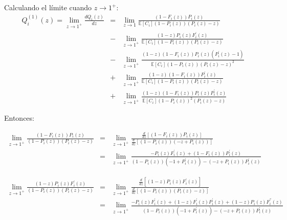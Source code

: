 \documentclass{article}
\newcommand{\esp}{\mathbb{E}}
\numberwithin{equation}{section}
\begin{document}
Calculando el l\'imite cuando $z\rightarrow1^{+}$:
\begin{eqnarray}
Q_{i}^{(1)}\left(z\right)=\lim_{z\rightarrow1^{+}}\frac{d Q_{i}\left(z\right)}{dz}&=&\lim_{z\rightarrow1}\frac{\left(1-F_{i}\left(z\right)\right)P_{i}\left(z\right)}{\esp\left[C_{i}\right]\left(1-P_{i}\left(z\right)\right)\left(P_{i}\left(z\right)-z\right)}\\
&-&\lim_{z\rightarrow1^{+}}\frac{\left(1-z\right)P_{i}\left(z\right)F_{i}^{'}\left(z\right)}{\esp\left[C_{i}\right]\left(1-P_{i}\left(z\right)\right)\left(P_{i}\left(z\right)-z\right)}\\
&-&\lim_{z\rightarrow1^{+}}\frac{\left(1-z\right)\left(1-F_{i}\left(z\right)\right)P_{i}\left(z\right)\left(P_{i}^{'}\left(z\right)-1\right)}{\esp\left[C_{i}\right]\left(1-P_{i}\left(z\right)\right)\left(P_{i}\left(z\right)-z\right)^{2}}\\
&+&\lim_{z\rightarrow1^{+}}\frac{\left(1-z\right)\left(1-F_{i}\left(z\right)\right)P_{i}^{'}\left(z\right)}{\esp\left[C_{i}\right]\left(1-P_{i}\left(z\right)\right)\left(P_{i}\left(z\right)-z\right)}\\
&+&\lim_{z\rightarrow1^{+}}\frac{\left(1-z\right)\left(1-F_{i}\left(z\right)\right)P_{i}\left(z\right)P_{i}^{'}\left(z\right)}{\esp\left[C_{i}\right]\left(1-P_{i}\left(z\right)\right)^{2}\left(P_{i}\left(z\right)-z\right)}
\end{eqnarray}

Entonces:

\begin{eqnarray*}
\lim_{z\rightarrow1^{+}}\frac{\left(1-F_{i}\left(z\right)\right)P_{i}\left(z\right)}{\left(1-P_{i}\left(z\right)\right)\left(P_{i}\left(z\right)-z\right)}&=&\lim_{z\rightarrow1^{+}}\frac{\frac{d}{dz}\left[\left(1-F_{i}\left(z\right)\right)P_{i}\left(z\right)\right]}{\frac{d}{dz}\left[\left(1-P_{i}\left(z\right)\right)\left(-z+P_{i}\left(z\right)\right)\right]}\\
&=&\lim_{z\rightarrow1^{+}}\frac{-P_{i}\left(z\right)F_{i}^{'}\left(z\right)+\left(1-F_{i}\left(z\right)\right)P_{i}^{'}\left(z\right)}{\left(1-P_{i}\left(z\right)\right)\left(-1+P_{i}^{'}\left(z\right)\right)-\left(-z+P_{i}\left(z\right)\right)P_{i}^{'}\left(z\right)}
\end{eqnarray*}




\begin{eqnarray*}
\lim_{z\rightarrow1^{+}}\frac{\left(1-z\right)P_{i}\left(z\right)F_{i}^{'}\left(z\right)}{\left(1-P_{i}\left(z\right)\right)\left(P_{i}\left(z\right)-z\right)}&=&\lim_{z\rightarrow1^{+}}\frac{\frac{d}{dz}\left[\left(1-z\right)P_{i}\left(z\right)F_{i}^{'}\left(z\right)\right]}{\frac{d}{dz}\left[\left(1-P_{i}\left(z\right)\right)\left(P_{i}\left(z\right)-z\right)\right]}\\
&=&\lim_{z\rightarrow1^{+}}\frac{-P_{i}\left(z\right) F_{i}^{'}\left(z\right)+(1-z) F_{i}^{'}\left(z\right) P_{i}^{'}\left(z\right)+(1-z) P_{i}\left(z\right)F_{i}^{''}\left(z\right)}{\left(1-P_{i}\left(z\right)\right)\left(-1+P_{i}^{'}\left(z\right)\right)-\left(-z+P_{i}\left(z\right)\right)P_{i}^{'}\left(z\right)}
\end{eqnarray*}
\end{document}
